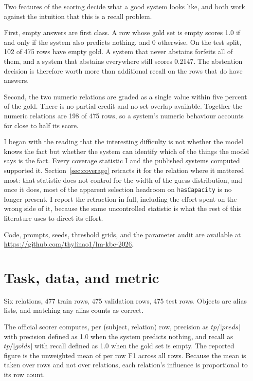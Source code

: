 \documentclass[11pt]{article}
\begin{document}
Two features of the scoring decide what a good system looks like, and both work
against the intuition that this is a recall problem.

First, empty answers are first class. A row whose gold set is empty scores 1.0
if and only if the system also predicts nothing, and 0 otherwise. On the test
split, 102 of 475 rows have empty gold. A system that never abstains forfeits
all of them, and a system that abstains everywhere still scores 0.2147. The
abstention decision is therefore worth more than additional recall on the rows
that do have answers.

Second, the two numeric relations are graded as a single value within five
percent of the gold. There is no partial credit and no set overlap available.
Together the numeric relations are 198 of 475 rows, so a system's numeric
behaviour accounts for close to half its score.

I began with the reading that the interesting difficulty is not whether the
model knows the fact but whether the system can identify which of the things the
model says is the fact. Every coverage statistic I and the published systems
computed supported it. Section~\ref{sec:coverage} retracts it for the relation
where it mattered most: that statistic does not control for the width of the
guess distribution, and once it does, most of the apparent selection headroom on
\texttt{hasCapacity} is no longer present. I report the retraction in full,
including the effort spent on the wrong side of it, because the same
uncontrolled statistic is what the rest of this literature uses to direct its
effort.

Code, prompts, seeds, threshold grids, and the parameter audit are available at
\url{https://github.com/thylinao1/lm-kbc-2026}.

\section{Task, data, and metric}

Six relations, 477 train rows, 475 validation rows, 475 test rows. Objects are
alias lists, and matching any alias counts as correct.

The official scorer computes, per (subject, relation) row, precision as
$tp / |\textit{preds}|$ with precision defined as 1.0 when the system predicts
nothing, and recall as $tp / |\textit{golds}|$ with recall defined as 1.0 when
the gold set is empty. The reported figure is the unweighted mean of per row F1
across all rows. Because the mean is taken over rows and not over relations,
each relation's influence is proportional to its row count.
\end{document}
